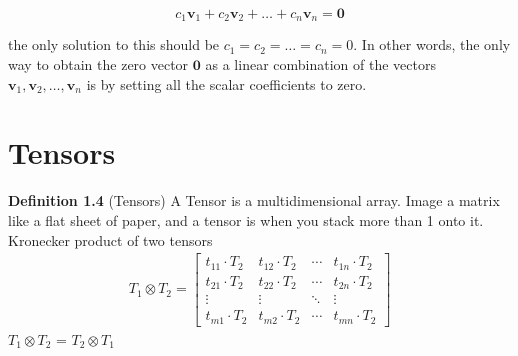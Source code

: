 \documentclass{report}
\begin{document}
\[ c_1 \mathbf{v}_1 + c_2 \mathbf{v}_2 + \ldots + c_n \mathbf{v}_n = \mathbf{0} \]

the only solution to this should be \( c_1 = c_2 = \ldots = c_n = 0 \). In other words, the only way to obtain the zero vector \( \mathbf{0} \) as a linear combination of the vectors \( \mathbf{v}_1, \mathbf{v}_2, \ldots, \mathbf{v}_n \) is by setting all the scalar coefficients to zero.


\section{Tensors}
\textbf{Definition 1.4} (Tensors) A Tensor is a multidimensional array. Image a matrix like a flat sheet of paper, and a tensor is when you stack more than 1 onto it.\\

\noindent Kronecker product of two tensors
\begin{align}
    T_1 \otimes T_2 = \begin{bmatrix}
    t_{11} \cdot T_2 & t_{12} \cdot T_2 & \cdots & t_{1n} \cdot T_2 \\
    t_{21} \cdot T_2 & t_{22} \cdot T_2 & \cdots & t_{2n} \cdot T_2 \\
    \vdots & \vdots & \ddots & \vdots \\
    t_{m1} \cdot T_2 & t_{m2} \cdot T_2 & \cdots & t_{mn} \cdot T_2
\end{bmatrix}
\end{align}
$T_1 \otimes T_2$ = $T_2 \otimes T_1$
\end{document}
